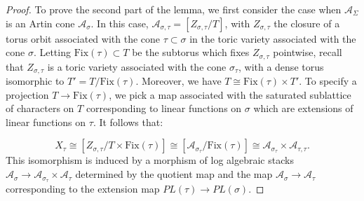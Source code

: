 \documentclass[12pt, oneside]{amsart}   	%
\newcommand{\Aut}{\operatorname{Aut}}
\numberwithin{equation}{section}
\numberwithin{thm}{section}
\numberwithin{figure}{section}
\begin{document}
\begin{proof}
%
%

To prove the second part of the lemma, we first consider the case when $\mathcal{A}_{\Sigma}$ is an Artin cone $\mathcal{A}_{\sigma}$. In this case, $\mathcal{A}_{\sigma,\tau} = [Z_{\sigma,\tau}/T]$, with $Z_{\sigma,\tau}$ the closure of a torus orbit associated with the cone $\tau \subset \sigma$ in the toric variety associated with the cone $\sigma$. Letting $\text{Fix}(\tau) \subset T$ be the subtorus which fixes $Z_{\sigma,\tau}$ pointwise, recall that $Z_{\sigma,\tau}$ is a toric variety associated with the cone $\sigma_{\tau}$, with a dense torus isomorphic to $T' = T/\text{Fix}(\tau)$. Moreover, we have $T \cong \text{Fix}(\tau)\times T'$. To specify a projection $T \rightarrow \text{Fix}(\tau)$, we pick a map associated with the saturated sublattice of characters on $T$ corresponding to linear functions on $\sigma$ which are extensions of linear functions on $\tau$. It follows that:

$$X_{\tau} \cong [Z_{\sigma,\tau}/T\times \text{Fix}(\tau)] \cong [\mathcal{A}_{\sigma_{\tau}}/\text{Fix}(\tau)] \cong \mathcal{A}_{\sigma_{\tau}} \times \mathcal{A}_{\tau,\tau}.$$
This isomorphism is induced by a morphism of log algebraic stacks $ \mathcal{A}_{\sigma} \rightarrow \mathcal{A}_{\sigma_{\tau}} \times \mathcal{A}_{\tau}$ determined by the quotient map and the map $\mathcal{A}_{\sigma} \rightarrow \mathcal{A}_{\tau}$ corresponding to the extension map $PL(\tau) \rightarrow PL(\sigma)$. 



\end{proof}
\end{document}
